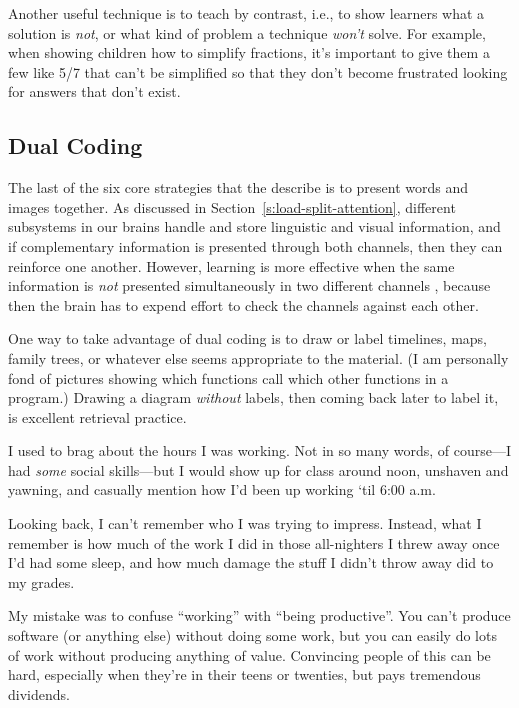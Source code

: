 Another useful technique is to teach by contrast, i.e., to show learners
what a solution is \emph{not}, or what kind of problem a technique \emph{won't}
solve. For example, when showing children how to simplify fractions,
it's important to give them a few like 5/7 that can't be simplified so
that they don't become frustrated looking for answers that don't exist.

\subsection*{Dual Coding}

The last of the six core strategies that the  describe is to present words and
images together. As discussed in Section~\ref{s:load-split-attention},
different subsystems in our brains handle and store linguistic and
visual information, and if complementary information is presented
through both channels, then they can reinforce one another. However,
learning is more effective when the same information is \emph{not}
presented simultaneously in two different channels
\cite{Maye2003}, because then the brain has to expend effort to
check the channels against each other.

One way to take advantage of dual coding is to draw or label timelines,
maps, family trees, or whatever else seems appropriate to the material.
(I am personally fond of pictures showing which functions call which
other functions in a program.) Drawing a diagram \emph{without} labels, then
coming back later to label it, is excellent retrieval practice.


I used to brag about the hours I was working. Not in so many words, of
course---I had \emph{some} social skills---but I would show up for class around
noon, unshaven and yawning, and casually mention how I'd been up working
`til 6:00 a.m.

Looking back, I can't remember who I was trying to impress. Instead,
what I remember is how much of the work I did in those all-nighters I
threw away once I'd had some sleep, and how much damage the stuff I
didn't throw away did to my grades.

My mistake was to confuse ``working'' with ``being productive''. You can't
produce software (or anything else) without doing some work, but you can
easily do lots of work without producing anything of value. Convincing
people of this can be hard, especially when they're in their teens or
twenties, but pays tremendous dividends.

